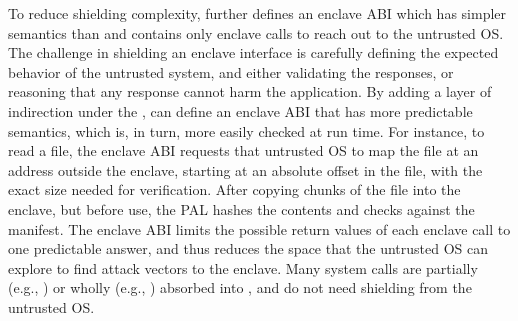 To reduce shielding complexity,
\graphenesgx{} further defines an enclave ABI which has simpler semantics than \thehostabi{}
and contains only \enclavecallnum{} enclave calls to reach out to the untrusted OS.
The challenge in shielding an enclave interface is carefully
defining the expected behavior of the untrusted system,
and either validating the responses, or reasoning that any response 
cannot harm the application.
By adding a layer of indirection under the \libos{}, \graphenesgx{} can define
an enclave ABI that has
more predictable semantics, which is, in turn, more easily checked at run time.
For instance, to read a file, the enclave ABI requests that untrusted OS to map the file at an address
outside the enclave,
starting at an absolute offset in the file, with the exact size needed for verification.
After copying chunks of the file into the enclave, but before use, 
the \sgx{} PAL hashes the contents
and checks against the manifest.
The enclave ABI limits the possible return values of each enclave call to one predictable answer, and thus reduces the space that the untrusted OS can explore to find attack vectors to the enclave.
Many system calls are partially (e.g., ) or wholly (e.g., ) absorbed into \thelibos{}, and do not need shielding from the untrusted OS.


